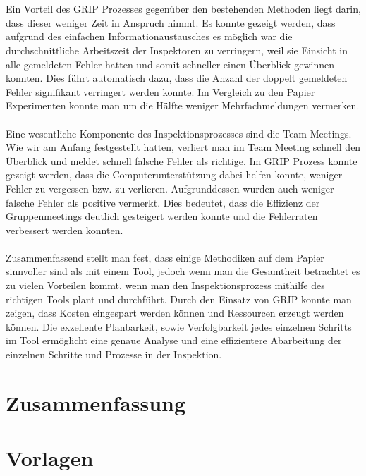 \documentclass{llncs}
\begin{document}
\\ \\
Ein Vorteil des GRIP Prozesses gegenüber den bestehenden Methoden liegt darin, dass dieser weniger Zeit in Anspruch nimmt. Es konnte gezeigt werden, dass aufgrund des einfachen Informationaustausches es möglich war die durchschnittliche Arbeitszeit der Inspektoren zu verringern, weil sie Einsicht in alle gemeldeten Fehler hatten und somit schneller einen Überblick gewinnen konnten. Dies führt automatisch dazu, dass die Anzahl der doppelt gemeldeten Fehler signifikant verringert werden konnte. Im Vergleich zu den Papier Experimenten konnte man um die Hälfte weniger Mehrfachmeldungen vermerken. 
\\ \\
Eine wesentliche Komponente des Inspektionsprozesses sind die Team Meetings. Wie wir am Anfang festgestellt hatten, verliert man im Team Meeting schnell den Überblick und meldet schnell falsche Fehler als richtige. Im GRIP Prozess konnte gezeigt werden, dass die Computerunterstützung dabei helfen konnte, weniger Fehler zu vergessen bzw. zu verlieren. Aufgrunddessen wurden auch weniger falsche Fehler als positive vermerkt. Dies bedeutet, dass die Effizienz der Gruppenmeetings deutlich gesteigert werden konnte und die Fehlerraten verbessert werden konnten. 
\\ \\
Zusammenfassend stellt man fest, dass einige Methodiken auf dem Papier sinnvoller sind als mit einem Tool, jedoch wenn man die Gesamtheit betrachtet es zu vielen Vorteilen kommt, wenn man den Inspektionsprozess mithilfe des richtigen Tools plant und durchführt. Durch den Einsatz von GRIP konnte man zeigen, dass Kosten eingespart werden können und Ressourcen erzeugt werden können. Die exzellente Planbarkeit, sowie Verfolgbarkeit jedes einzelnen Schritts im Tool ermöglicht eine genaue Analyse und eine effizientere Abarbeitung der einzelnen Schritte und Prozesse in der Inspektion.

\section{Zusammenfassung}


\section{Vorlagen}
\end{document}
